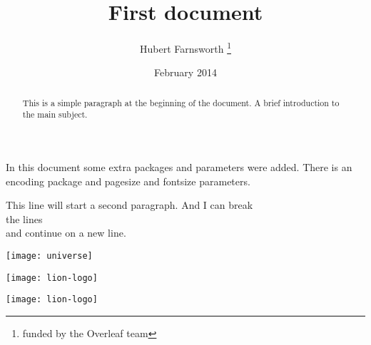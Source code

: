 \documentclass[12pt,letterpaper]{article}
\title{First document}
\author{Hubert Farnsworth \thanks{funded by the Overleaf team}}
\date{February 2014}
\begin{document}
\begin{titlepage}
\maketitle


\begin{abstract}
This is a simple paragraph at the beginning of the document. A brief introduction to the main subject.
\end{abstract}

\end{titlepage}

In this document some extra packages and parameters
were added. There is an encoding package
and pagesize and fontsize parameters.


This line will start a second paragraph. And I can
 break\\ the lines \\ and continue on a new line.

\begin{comment}
This text won't show up in the compiled pdf
this is just a multi-line comment. Useful
to, for instance, comment out slow-rendering parts
while working on a draft.
\end{comment}



\texttt{[image: universe]}

\texttt{[image: lion-logo]}

\texttt{[image: lion-logo]}

\end{document}

